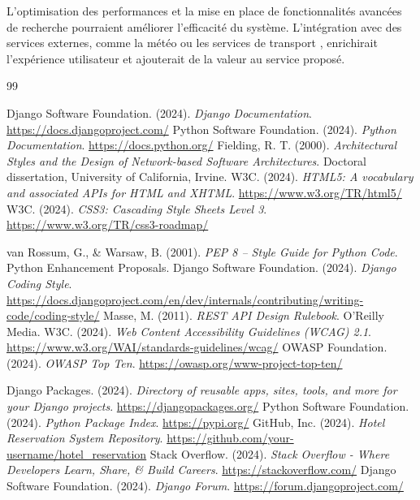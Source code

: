 \documentclass[12pt,a4paper]{report}
\begin{document}
L'optimisation des performances et la mise en place de fonctionnalités avancées de recherche \cite{rest-best} pourraient améliorer l'efficacité du système. L'intégration avec des services externes, comme la météo ou les services de transport \cite{opentravel}, enrichirait l'expérience utilisateur et ajouterait de la valeur au service proposé.


\begin{thebibliography}{99}

 Django Software Foundation. (2024). \textit{Django Documentation}. \url{https://docs.djangoproject.com/}
 Python Software Foundation. (2024). \textit{Python Documentation}. \url{https://docs.python.org/}
 Fielding, R. T. (2000). \textit{Architectural Styles and the Design of Network-based Software Architectures}. Doctoral dissertation, University of California, Irvine.
 W3C. (2024). \textit{HTML5: A vocabulary and associated APIs for HTML and XHTML}. \url{https://www.w3.org/TR/html5/}
 W3C. (2024). \textit{CSS3: Cascading Style Sheets Level 3}. \url{https://www.w3.org/TR/css3-roadmap/}

 van Rossum, G., \& Warsaw, B. (2001). \textit{PEP 8 -- Style Guide for Python Code}. Python Enhancement Proposals.
 Django Software Foundation. (2024). \textit{Django Coding Style}. \url{https://docs.djangoproject.com/en/dev/internals/contributing/writing-code/coding-style/}
 Masse, M. (2011). \textit{REST API Design Rulebook}. O'Reilly Media.
 W3C. (2024). \textit{Web Content Accessibility Guidelines (WCAG) 2.1}. \url{https://www.w3.org/WAI/standards-guidelines/wcag/}
 OWASP Foundation. (2024). \textit{OWASP Top Ten}. \url{https://owasp.org/www-project-top-ten/}

 Django Packages. (2024). \textit{Directory of reusable apps, sites, tools, and more for your Django projects}. \url{https://djangopackages.org/}
 Python Software Foundation. (2024). \textit{Python Package Index}. \url{https://pypi.org/}
 GitHub, Inc. (2024). \textit{Hotel Reservation System Repository}. \url{https://github.com/your-username/hotel_reservation}
 Stack Overflow. (2024). \textit{Stack Overflow - Where Developers Learn, Share, \& Build Careers}. \url{https://stackoverflow.com/}
 Django Software Foundation. (2024). \textit{Django Forum}. \url{https://forum.djangoproject.com/}


\end{thebibliography}
\end{document}

